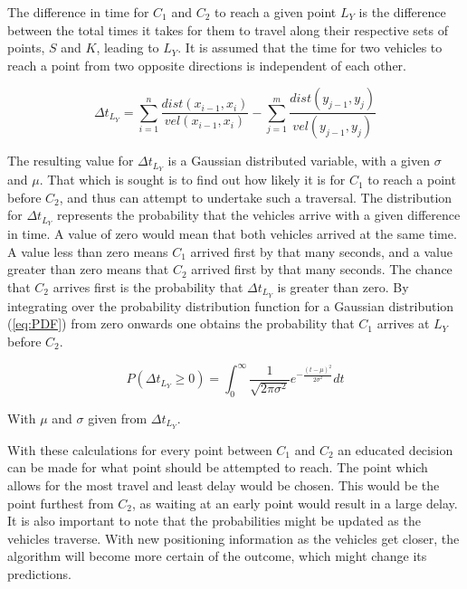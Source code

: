 \documentclass{article}
\begin{document}
			The difference in time for $C_1$ and $C_2$ to reach a given point $L_Y$ is the difference between the total times it takes for them to travel along their respective sets of points, $S$ and $K$, leading to $L_Y$. It is assumed that the time for two vehicles to reach a point from two opposite directions is independent of each other.

			\begin{equation}
				\Delta{t}_{L_Y} = \sum_{i=1}^{n} \frac{dist(x_{i-1}, x_i)}{vel(x_{i-1}, x_i)} -\sum_{j=1}^{m} \frac{dist(y_{j-1}, y_j)}{vel(y_{j-1}, y_j)}
				\label{eq:deltaT}
			\end{equation}

			The resulting value for $\Delta{t}_{L_Y}$ is a Gaussian distributed variable, with a given $\sigma$ and $\mu$. That which is sought is to find out how likely it is for $C_1$ to reach a point before $C_2$, and thus can attempt to undertake such a traversal. The distribution for $\Delta{t}_{L_Y}$ represents the probability that the vehicles arrive with a given difference in time. A value of zero would mean that both vehicles arrived at the same time. A value less than zero means $C_1$ arrived first by that many seconds, and a value greater than zero means that $C_2$ arrived first by that many seconds. The chance that $C_2$ arrives first is the probability that $\Delta{t}_{L_Y}$ is greater than zero. By integrating over the probability distribution function for a Gaussian distribution (\ref{eq:PDF}) from zero onwards one obtains the probability that $C_1$ arrives at $L_Y$ before $C_2$.

			\begin{equation}
				P(\Delta{t}_{L_Y} \geq 0) = \int_0^\infty \frac{1}{\sqrt{2\pi\sigma^2}}e^{-\frac{(t-\mu)^2}{2\sigma^2}} dt
			\end{equation}

			With $\mu$ and $\sigma$ given from $\Delta{t}_{L_Y}$.

			With these calculations for every point between $C_1$ and $C_2$ an educated decision can be made for what point should be attempted to reach. The point which allows for the most travel and least delay would be chosen. This would be the point furthest from $C_2$, as waiting at an early point would result in a large delay. It is also important to note that the probabilities might be updated as the vehicles traverse. With new positioning information as the vehicles get closer, the algorithm will become more certain of the outcome, which might change its predictions.
\end{document}
